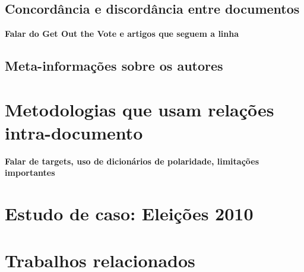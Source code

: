 \section{Concordância e discordância entre documentos}
  \textbf{Falar do Get Out the Vote e artigos que seguem a linha}

\section{Meta-informações sobre os autores}

\chapter{Metodologias que usam relações intra-documento}

\textbf{Falar de targets, uso de dicionários de polaridade, limitações importantes}

\chapter{Estudo de caso: Eleições 2010}

\chapter{Trabalhos relacionados}
